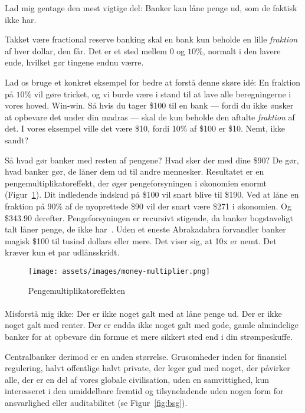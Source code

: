 Lad mig gentage den mest vigtige del: Banker kan låne penge ud, som de faktisk 
ikke har.

Takket være fractional reserve banking skal en bank kun beholde en lille
\textit{fraktion} af hver dollar, den får. Det er et sted mellem $0$ og $10\%$,
normalt i den lavere ende, hvilket gør tingene endnu værre.

Lad os bruge et konkret eksempel for bedre at forstå denne skøre idé: En
fraktion på $10\%$ vil gøre tricket, og vi burde være i stand til at lave alle
beregningerne i vores hoved. Win-win. Så hvis du tager \$100 til en
bank --- fordi du ikke ønsker at opbevare det under din madras --- skal de kun
beholde den aftalte \textit{fraktion} af det. I vores eksempel ville det
være \$10, fordi 10\% af \$100 er \$10. Nemt, ikke sandt?

Så hvad gør banker med resten af pengene? Hvad sker der med dine \$90? De
gør, hvad banker gør, de låner dem ud til andre mennesker. Resultatet er en 
pengemultiplikatoreffekt, der øger pengeforsyningen i økonomien enormt
(Figur~\ref{fig:money-multiplier}). Dit indledende indskud på \$100 vil snart
blive til \$190. Ved at låne en fraktion på 90\% af de nyoprettede \$90 vil der
snart være \$271 i økonomien. Og \$343.90 derefter. Pengeforsyningen er
recursivt stigende, da banker bogstaveligt talt låner penge, de ikke
har~\cite{wiki:money-multiplier}. Uden et eneste Abrakadabra forvandler
banker magisk \$100 til tusind dollars eller mere. Det viser sig, at 10x er 
nemt. Det kræver kun et par udlånsskridt.

\begin{figure}[htbp]
  \centering
  \texttt{[image: assets/images/money-multiplier.png]}
  \caption{Pengemultiplikatoreffekten}
  \label{fig:money-multiplier}
\end{figure}
  
\paragraph{}
Misforstå mig ikke: Der er ikke noget galt med at låne penge ud. Der er
ikke noget galt med renter. Der er endda ikke noget galt med gode,
gamle almindelige banker for at opbevare din formue et mere sikkert sted end i
din strømpeskuffe.

Centralbanker derimod er en anden størrelse. Grusomheder inden for finansiel
regulering, halvt offentlige halvt private, der leger gud med noget, der
påvirker alle, der er en del af vores globale civilisation, uden en
samvittighed, kun interesseret i den umiddelbare fremtid og tilsyneladende
uden nogen form for ansvarlighed eller auditabilitet (se Figur~\ref{fig:bsg}).

